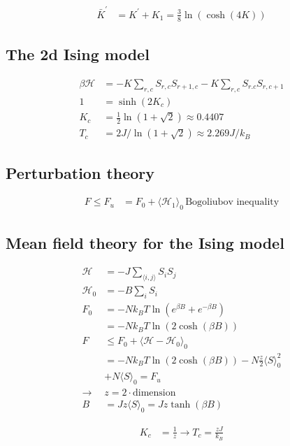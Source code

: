 \begin{equation*}
    \begin{aligned}
        \bar{K}^{'} &= K^{'} + K_1 = \frac{3}{8} \ln(\cosh(4K))
    \end{aligned}
\end{equation*}

\pagebreak
\subsection*{ The 2d Ising model}
\begin{equation*}
    \begin{aligned}
        \beta \mathcal{H} &= -K\sum_{r,c} S_{r,c} S_{r+1,c} - K \sum_{r,c} S_{r.c} S_{r,c+1} \\
        1 &= \sinh(2K_c) \\
        K_c &= \frac{1}{2} \ln \left(1+ \sqrt{2}\right) \approx 0.4407 \\
        T_c &= 2J / \ln \left(1 + \sqrt{2}\right) \approx 2.269 J/k_B
    \end{aligned}
\end{equation*}

\subsection*{Perturbation theory}
\begin{equation*}
    \begin{aligned}
        F \leq F_u &= F_0 + \langle \mathcal{H}_1 \rangle_0 \, \text{Bogoliubov inequality}
    \end{aligned}
\end{equation*}

\subsection*{Mean field theory for the Ising model}
\begin{equation*}
    \begin{aligned}
        \mathcal{H} &= -J \sum_{\langle i,j \rangle} S_i S_j \\
        \mathcal{H}_0 &= -B \sum_i S_i \\
        F_0 &= -N k_B T \ln \left(e^{\beta B} + e^{-\beta B}\right) \\
            &= -N k_B T \ln (2 \cosh(\beta B)) \\
        F &\leq F_0 + \langle \mathcal{H} - \mathcal{H}_0 \rangle_0 \\
            &= -N k_B T \ln(2 \cosh(\beta B)) - N \frac{z}{2} \langle S \rangle_0^2 \\
            &+ N \langle S \rangle_0 = F_u\\
        \rightarrow & z = 2 \cdot \text{dimension} \\
        B &= J z \langle S \rangle_0 = Jz \tanh(\beta B) 
    \end{aligned}
\end{equation*}

\begin{equation*}
    \begin{aligned}
        K_c &= \frac{1}{z} \rightarrow T_c = \frac{zJ}{k_B}
    \end{aligned}
\end{equation*}